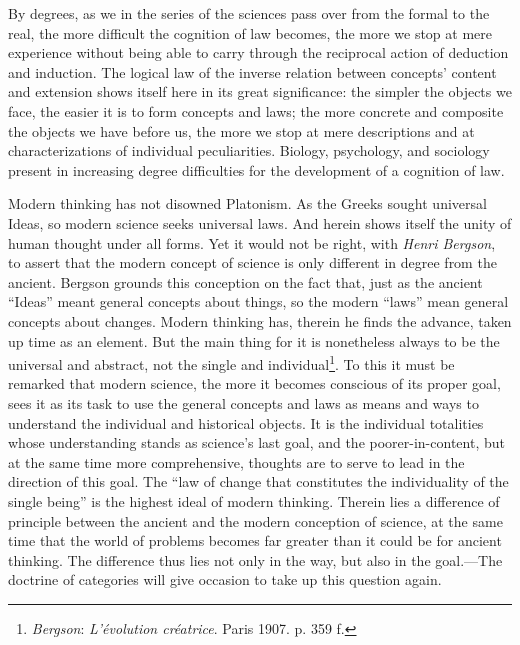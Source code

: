 \documentclass[12pt,a4paper]{book}
\newcommand{\opage}[1]{\marginnote{\footnotesize\textit{[#1]}}}
\begin{document}
By degrees, as we in the series of the sciences pass over from the formal
to the real, the more difficult the cognition of law becomes, the more we
stop at mere experience without being able to \opage{133}carry through the reciprocal
action of deduction and induction. The logical law of the inverse relation
between concepts' content and extension shows itself here in its great
significance: the simpler the objects we face, the easier it is to form
concepts and laws; the more concrete and composite the objects we have
before us, the more we stop at mere descriptions and at characterizations
of individual peculiarities. Biology, psychology, and sociology present in
increasing degree difficulties for the development of a cognition of law.

Modern thinking has not disowned Platonism. As the Greeks sought universal
Ideas, so modern science seeks universal laws. And herein shows itself the
unity of human thought under all forms. Yet it would not be right, with
\emph{Henri Bergson}, to assert that the modern concept of science is only
different in degree from the ancient. Bergson grounds this conception on
the fact that, just as the ancient ``Ideas'' meant general concepts about
things, so the modern ``laws'' mean general concepts about changes. Modern
thinking has, therein he finds the advance, taken up time as an element.
But the main thing for it is nonetheless always to be the universal and
abstract, not the single and individual\footnote{\emph{Bergson}:
\emph{L'évolution créatrice}. Paris 1907. p. 359 f.}. To this it must be
remarked that modern science, the more it becomes conscious of its proper
goal, sees it as its task to use the general concepts and laws as means and
ways to understand the individual and historical objects. It is the
individual totalities whose understanding stands as science's last goal,
and the poorer-in-content, but at the same time more comprehensive,
thoughts are to serve to lead in the direction of this goal. The ``law of
change that constitutes the individuality of the single being'' is the
highest ideal of modern thinking. Therein lies a difference of principle
between the ancient and the modern conception of science, at the same time
that the world of problems becomes far greater than it could be for ancient
thinking. The difference thus lies not only in the way, but also in the
goal.---The doctrine of categories will give occasion to take up this
question again.
\end{document}

